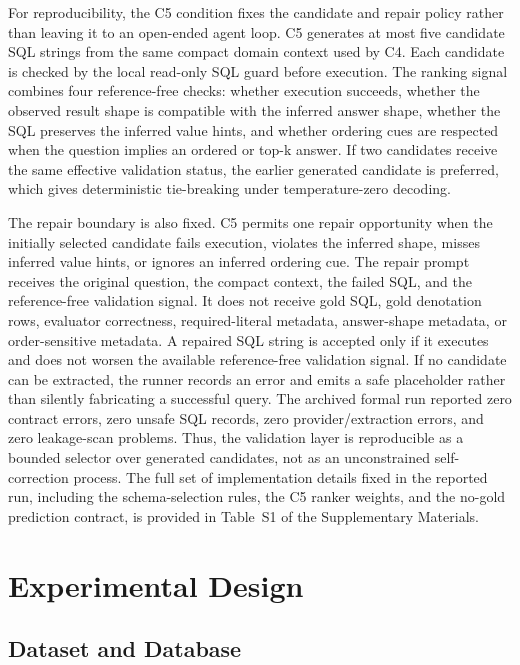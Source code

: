 \documentclass[applsci,article,submit,moreauthors]{Definitions/mdpi}
\begin{document}
For reproducibility, the C5 condition fixes the candidate and repair policy rather than leaving it to an open-ended agent loop. C5 generates at most five candidate SQL strings from the same compact domain context used by C4. Each candidate is checked by the local read-only SQL guard before execution. The ranking signal combines four reference-free checks: whether execution succeeds, whether the observed result shape is compatible with the inferred answer shape, whether the SQL preserves the inferred value hints, and whether ordering cues are respected when the question implies an ordered or top-k answer. If two candidates receive the same effective validation status, the earlier generated candidate is preferred, which gives deterministic tie-breaking under temperature-zero decoding.

The repair boundary is also fixed. C5 permits one repair opportunity when the initially selected candidate fails execution, violates the inferred shape, misses inferred value hints, or ignores an inferred ordering cue. The repair prompt receives the original question, the compact context, the failed SQL, and the reference-free validation signal. It does not receive gold SQL, gold denotation rows, evaluator correctness, required-literal metadata, answer-shape metadata, or order-sensitive metadata. A repaired SQL string is accepted only if it executes and does not worsen the available reference-free validation signal. If no candidate can be extracted, the runner records an error and emits a safe placeholder rather than silently fabricating a successful query. The archived formal run reported zero contract errors, zero unsafe SQL records, zero provider/extraction errors, and zero leakage-scan problems. Thus, the validation layer is reproducible as a bounded selector over generated candidates, not as an unconstrained self-correction process. The full set of implementation details fixed in the reported run, including the schema-selection rules, the C5 ranker weights, and the no-gold prediction contract, is provided in Table~S1 of the Supplementary Materials.

\section{Experimental Design}\label{experiments}

\subsection{Dataset and Database}\label{sect:e1}
\end{document}
